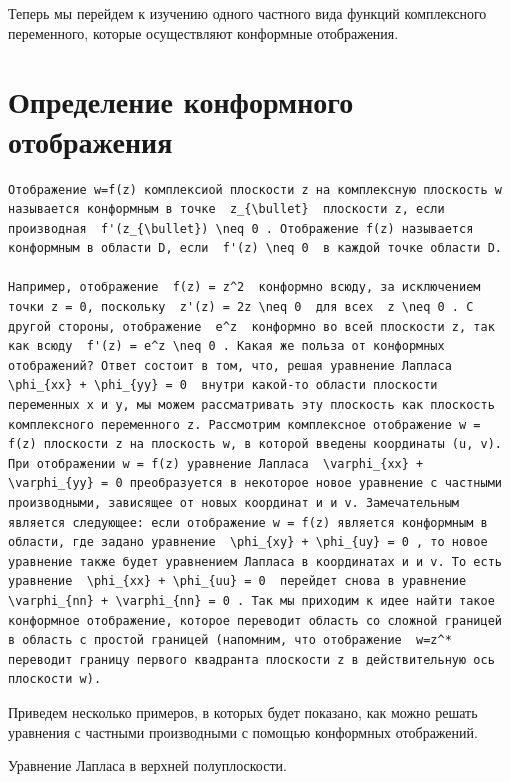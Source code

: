\documentclass[
  ukrainian,
]{article}
\begin{document}
Теперь мы перейдем к изучению одного частного вида функций комплексного
переменного, которые осуществляют конформные отображения.

\section{Определение конформного
отображения}\label{ux43eux43fux440ux435ux434ux435ux43bux435ux43dux438ux435-ux43aux43eux43dux444ux43eux440ux43cux43dux43eux433ux43e-ux43eux442ux43eux431ux440ux430ux436ux435ux43dux438ux44f}

\begin{verbatim}
Отображение w=f(z) комплексиой плоскости z на комплексную плоскость w называется конформным в точке  z_{\bullet}  плоскости z, если производная  f'(z_{\bullet}) \neq 0 . Отображение f(z) называется конформным в области D, если  f'(z) \neq 0  в каждой точке области D.

Например, отображение  f(z) = z^2  конформно всюду, за исключением точки z = 0, поскольку  z'(z) = 2z \neq 0  для всех  z \neq 0 . C другой стороны, отображение  e^z  конформно во всей плоскости z, так как всюду  f'(z) = e^z \neq 0 . Какая же польза от конформных отображений? Ответ состоит в том, что, решая уравнение Лапласа  \phi_{xx} + \phi_{yy} = 0  внутри какой-то области плоскости переменных x и y, мы можем рассматривать эту плоскость как плоскость комплексного переменного z. Рассмотрим комплексное отображение w = f(z) плоскости z на плоскость w, в которой введены координаты (u, v). При отображении w = f(z) уравнение Лапласа  \varphi_{xx} + \varphi_{yy} = 0 преобразуется в некоторое новое уравнение с частными производными, зависящее от новых координат и и v. Замечательным является следующее: если отображение w = f(z) является конформным в области, где задано уравнение  \phi_{xy} + \phi_{uy} = 0 , то новое уравнение также будет уравнением Лапласа в координатах и и v. To есть уравнение  \phi_{xx} + \phi_{uu} = 0  перейдет снова в уравнение  \varphi_{nn} + \varphi_{nn} = 0 . Так мы приходим к идее найти такое конформное отображение, которое переводит область со сложной границей в область с простой границей (напомним, что отображение  w=z^*  переводит границу первого квадранта плоскости z в действительную ось плоскости w).
\end{verbatim}

Приведем несколько примеров, в которых будет показано, как можно решать
уравнения с частными производными с помощью конформных отображений.

Уравнение Лапласа в верхней полуплоскости.
\end{document}
